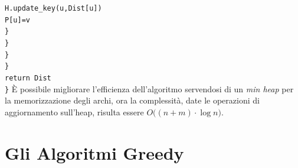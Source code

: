\documentclass[12pt, letterpaper]{article}
\newcommand{\code}[1]{\colorbox{light-gray}{\texttt{#1}}}
\begin{document}
{\hphantom{ident}\hphantom{ident}\hphantom{ident}\hphantom{ident}\hphantom{ident}\code{H.update\_key(u,Dist[u])}\\
\hphantom{ident}\hphantom{ident}\hphantom{ident}\hphantom{ident}\hphantom{ident}\code{P[u]=v}\\
\hphantom{ident}\hphantom{ident}\hphantom{ident}\hphantom{ident}\code{\}}\\
\hphantom{ident}\hphantom{ident}\hphantom{ident}\code{\}}\\
\hphantom{ident}\hphantom{ident}\code{\}}\\
\hphantom{ident}\code{\}}\\
\hphantom{ident}\code{return Dist}\\
\code{\}}}
È possibile migliorare l'efficienza dell'algoritmo servendosi di un \textit{min heap} per la memorizzazione degli archi,
ora la complessità, date le operazioni di aggiornamento sull'heap, risulta essere $O\big((n+m)\cdot\log{n}\big)$.
\section{Gli Algoritmi Greedy}
\end{document}
